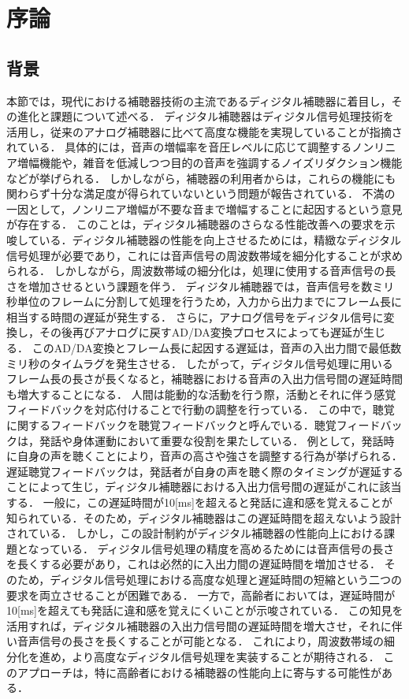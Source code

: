 \chapter{序論}

\section{背景}
本節では，現代における補聴器技術の主流であるディジタル補聴器に着目し，その進化と課題について述べる．
ディジタル補聴器はディジタル信号処理技術を活用し，従来のアナログ補聴器に比べて高度な機能を実現していることが指摘されている\cite{EaringAids_20}\cite{EaringAids-2}．
具体的には，音声の増幅率を音圧レベルに応じて調整するノンリニア増幅機能や，雑音を低減しつつ目的の音声を強調するノイズリダクション機能などが挙げられる．
しかしながら，補聴器の利用者からは，これらの機能にも関わらず十分な満足度が得られていないという問題が報告されている\cite{Manzokudo}．
不満の一因として，ノンリニア増幅が不要な音まで増幅することに起因するという意見が存在する．
このことは，ディジタル補聴器のさらなる性能改善への要求を示唆している．ディジタル補聴器の性能を向上させるためには，精緻なディジタル信号処理が必要であり，これには音声信号の周波数帯域を細分化することが求められる．
しかしながら，周波数帯域の細分化は，処理に使用する音声信号の長さを増加させるという課題を伴う．
ディジタル補聴器では，音声信号を数ミリ秒単位のフレームに分割して処理を行うため，入力から出力までにフレーム長に相当する時間の遅延が発生する．
さらに，アナログ信号をディジタル信号に変換し，その後再びアナログに戻すAD/DA変換プロセスによっても遅延が生じる．
このAD/DA変換とフレーム長に起因する遅延は，音声の入出力間で最低数ミリ秒のタイムラグを発生させる．
したがって，ディジタル信号処理に用いるフレーム長の長さが長くなると，補聴器における音声の入出力信号間の遅延時間も増大することになる．
人間は能動的な活動を行う際，活動とそれに伴う感覚フィードバックを対応付けることで行動の調整を行っている．
この中で，聴覚に関するフィードバックを聴覚フィードバックと呼んでいる\cite{DAF}．聴覚フィードバックは，発話や身体運動において重要な役割を果たしている．
例として，発話時に自身の声を聴くことにより，音声の高さや強さを調整する行為が挙げられる．
遅延聴覚フィードバックは，発話者が自身の声を聴く際のタイミングが遅延することによって生じ，ディジタル補聴器における入出力信号間の遅延がこれに該当する．
一般に，この遅延時間が10[ms]を超えると発話に違和感を覚えることが知られている\cite{DelayTime-ninnchi}．そのため，ディジタル補聴器はこの遅延時間を超えないよう設計されている\cite{EaringAids_20}．
しかし，この設計制約がディジタル補聴器の性能向上における課題となっている．
ディジタル信号処理の精度を高めるためには音声信号の長さを長くする必要があり，これは必然的に入出力間の遅延時間を増加させる．
そのため，ディジタル信号処理における高度な処理と遅延時間の短縮という二つの要求を両立させることが困難である．
一方で，高齢者においては，遅延時間が10[ms]を超えても発話に違和感を覚えにくいことが示唆されている\cite{shigematu-toukyoushibu}．
この知見を活用すれば，ディジタル補聴器の入出力信号間の遅延時間を増大させ，それに伴い音声信号の長さを長くすることが可能となる．
これにより，周波数帯域の細分化を進め，より高度なディジタル信号処理を実装することが期待される．
このアプローチは，特に高齢者における補聴器の性能向上に寄与する可能性がある．
